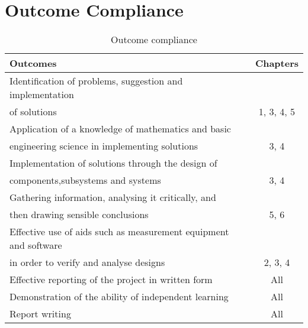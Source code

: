 \chapter{Outcome Compliance}

\begin{table}[htbp]
\centering
\caption{Outcome compliance}
\label{Outcome_compliance}
\begin{tabular}{|l|c|}
  \hline
  \textbf{Outcomes} & \textbf{Chapters} \\
  \hline
  Identification of problems, suggestion and implementation &\\
  of solutions & 1, 3, 4, 5 \\
  \hline
  Application of a knowledge of mathematics and basic &\\
  engineering science in implementing solutions & 3, 4 \\
  \hline
  Implementation of solutions through the design of &\\
  components,subsystems and systems & 3, 4 \\
  \hline
  Gathering information, analysing it critically, and &\\
  then drawing sensible conclusions & 5, 6 \\
  \hline
  Effective use of aids such as measurement equipment and software &\\
  in order to verify and analyse designs & 2, 3, 4 \\
  \hline
  Effective reporting of the project in written form & All \\
  \hline
  Demonstration of the ability of independent learning & All \\
  \hline
  Report writing & All \\
  \hline
\end{tabular}
\end{table}